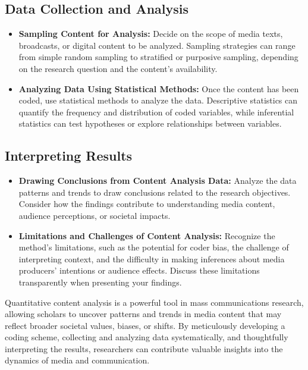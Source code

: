 \documentclass[
]{book}
\begin{document}
\hypertarget{data-collection-and-analysis}{%
\subsection*{Data Collection and Analysis}\label{data-collection-and-analysis}}

\begin{itemize}
\item
  \textbf{Sampling Content for Analysis:} Decide on the scope of media texts, broadcasts, or digital content to be analyzed. Sampling strategies can range from simple random sampling to stratified or purposive sampling, depending on the research question and the content's availability.
\item
  \textbf{Analyzing Data Using Statistical Methods:} Once the content has been coded, use statistical methods to analyze the data. Descriptive statistics can quantify the frequency and distribution of coded variables, while inferential statistics can test hypotheses or explore relationships between variables.
\end{itemize}

\hypertarget{interpreting-results}{%
\subsection*{Interpreting Results}\label{interpreting-results}}

\begin{itemize}
\item
  \textbf{Drawing Conclusions from Content Analysis Data:} Analyze the data patterns and trends to draw conclusions related to the research objectives. Consider how the findings contribute to understanding media content, audience perceptions, or societal impacts.
\item
  \textbf{Limitations and Challenges of Content Analysis:} Recognize the method's limitations, such as the potential for coder bias, the challenge of interpreting context, and the difficulty in making inferences about media producers' intentions or audience effects. Discuss these limitations transparently when presenting your findings.
\end{itemize}

Quantitative content analysis is a powerful tool in mass communications research, allowing scholars to uncover patterns and trends in media content that may reflect broader societal values, biases, or shifts. By meticulously developing a coding scheme, collecting and analyzing data systematically, and thoughtfully interpreting the results, researchers can contribute valuable insights into the dynamics of media and communication.
\end{document}
